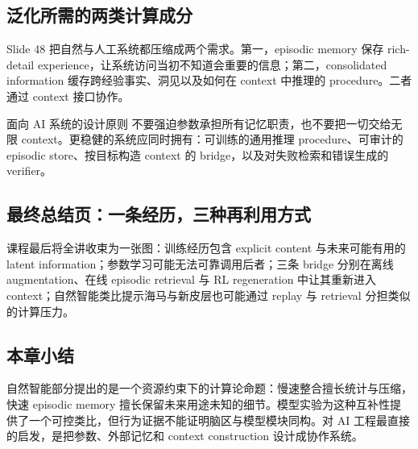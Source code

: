 \subsection{泛化所需的两类计算成分}

Slide 48 把自然与人工系统都压缩成两个需求。第一，episodic memory 保存 rich-detail experience，让系统访问当初不知道会重要的信息；第二，consolidated information 缓存跨经验事实、洞见以及如何在 context 中推理的 procedure。二者通过 context 接口协作。


\begin{importantbox}{面向 AI 系统的设计原则}
不要强迫参数承担所有记忆职责，也不要把一切交给无限 context。更稳健的系统应同时拥有：可训练的通用推理 procedure、可审计的 episodic store、按目标构造 context 的 bridge，以及对失败检索和错误生成的 verifier。
\end{importantbox}

\subsection{最终总结页：一条经历，三种再利用方式}

课程最后将全讲收束为一张图：训练经历包含 explicit content 与未来可能有用的 latent information；参数学习可能无法可靠调用后者；三条 bridge 分别在离线 augmentation、在线 episodic retrieval 与 RL regeneration 中让其重新进入 context；自然智能类比提示海马与新皮层也可能通过 replay 与 retrieval 分担类似的计算压力。



\subsection{本章小结}

自然智能部分提出的是一个资源约束下的计算论命题：慢速整合擅长统计与压缩，快速 episodic memory 擅长保留未来用途未知的细节。模型实验为这种互补性提供了一个可控类比，但行为证据不能证明脑区与模型模块同构。对 AI 工程最直接的启发，是把参数、外部记忆和 context construction 设计成协作系统。

